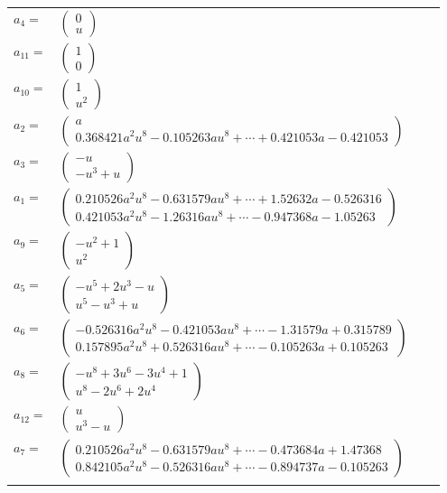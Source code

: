 \documentclass[1p]{elsarticle_modified}
\theoremstyle{definition}
\begin{document}
\begin{tabular}{m{7pt} m{180pt} m{7pt} m{180pt} }
\flushright $a_{4}=$&$\begin{pmatrix}0\\u\end{pmatrix}$ \\
\flushright $a_{11}=$&$\begin{pmatrix}1\\0\end{pmatrix}$ \\
\flushright $a_{10}=$&$\begin{pmatrix}1\\u^2\end{pmatrix}$ \\
\flushright $a_{2}=$&$\begin{pmatrix}a\\0.368421 a^{2} u^{8}-0.105263 a u^{8}+\cdots+0.421053 a-0.421053\end{pmatrix}$ \\
\flushright $a_{3}=$&$\begin{pmatrix}- u\\- u^3+u\end{pmatrix}$ \\
\flushright $a_{1}=$&$\begin{pmatrix}0.210526 a^{2} u^{8}-0.631579 a u^{8}+\cdots+1.52632 a-0.526316\\0.421053 a^{2} u^{8}-1.26316 a u^{8}+\cdots-0.947368 a-1.05263\end{pmatrix}$ \\
\flushright $a_{9}=$&$\begin{pmatrix}- u^2+1\\u^2\end{pmatrix}$ \\
\flushright $a_{5}=$&$\begin{pmatrix}- u^5+2 u^3- u\\u^5- u^3+u\end{pmatrix}$ \\
\flushright $a_{6}=$&$\begin{pmatrix}-0.526316 a^{2} u^{8}-0.421053 a u^{8}+\cdots-1.31579 a+0.315789\\0.157895 a^{2} u^{8}+0.526316 a u^{8}+\cdots-0.105263 a+0.105263\end{pmatrix}$ \\
\flushright $a_{8}=$&$\begin{pmatrix}- u^8+3 u^6-3 u^4+1\\u^8-2 u^6+2 u^4\end{pmatrix}$ \\
\flushright $a_{12}=$&$\begin{pmatrix}u\\u^3- u\end{pmatrix}$ \\
\flushright $a_{7}=$&$\begin{pmatrix}0.210526 a^{2} u^{8}-0.631579 a u^{8}+\cdots-0.473684 a+1.47368\\0.842105 a^{2} u^{8}-0.526316 a u^{8}+\cdots-0.894737 a-0.105263\end{pmatrix}$\\&\end{tabular}
\end{document}
